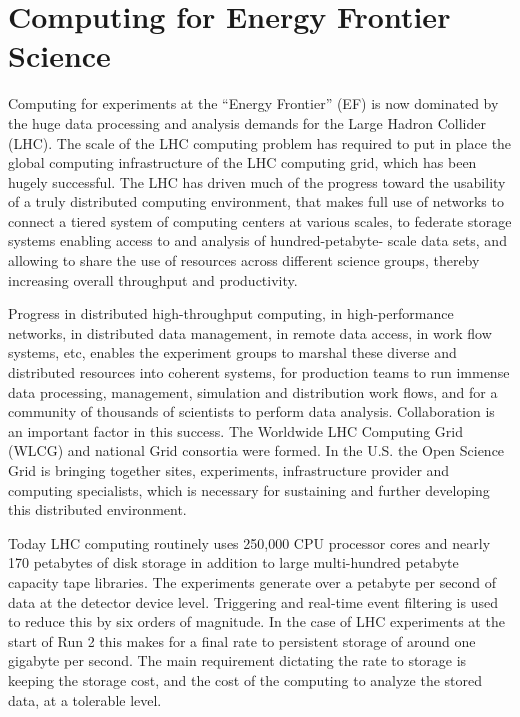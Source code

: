 
\section{Computing for Energy Frontier Science}

Computing for experiments at the ``Energy Frontier'' (EF) is now dominated by
the huge data processing and analysis demands for the Large Hadron Collider
(LHC). The scale of the LHC computing problem has required to put in place the
global computing infrastructure of the LHC computing grid, which has been
hugely successful.  The LHC has driven much of the progress toward the
usability of a truly distributed computing environment, that makes full use of
networks to connect a tiered system of computing centers at various scales, to
federate storage systems enabling access to and analysis of hundred-petabyte-
scale data sets, and allowing to share the use of resources across different
science groups, thereby increasing overall throughput and productivity.

Progress in distributed high-throughput computing, in high-performance
networks, in distributed data management, in remote data access, in work flow
systems, etc, enables the experiment groups to marshal these diverse and
distributed resources into coherent systems, for production teams to run
immense data processing, management, simulation and distribution work flows,
and for a community of thousands of scientists to perform data analysis.
Collaboration is an important factor in this success. The Worldwide LHC
Computing Grid (WLCG)  and national Grid consortia were formed. In the U.S.
the Open Science Grid is  bringing together sites, experiments, infrastructure
provider and computing specialists, which is necessary for  sustaining and
further developing this distributed environment.

Today LHC computing routinely uses 250,000 CPU processor cores and nearly 170
petabytes of disk storage in addition to large multi-hundred petabyte capacity
tape libraries.  The experiments generate over a petabyte per second of data
at the detector device level. Triggering and real-time event filtering  is
used to reduce this by six orders of magnitude. In the case of LHC experiments
at the start of Run 2 this makes for a final rate to persistent storage of
around one gigabyte per second. The main requirement dictating the rate to
storage is keeping the storage cost, and the  cost of the computing to analyze
the stored data, at a tolerable level.

